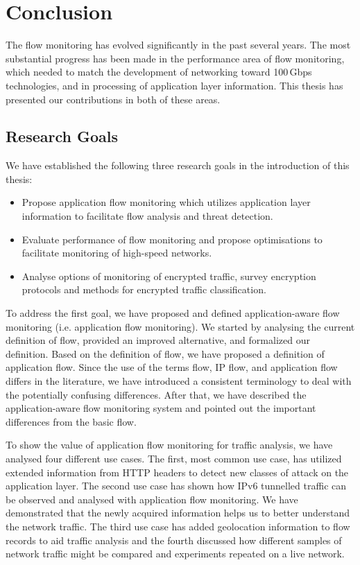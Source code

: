 \chapter{Conclusion}\label{chap:conclusions}

The flow monitoring has evolved significantly in the past several years. The most substantial progress has been made in the performance  area of flow monitoring, which needed to match the development of networking toward 100\,Gbps technologies, and in processing of application layer information. This thesis has presented our contributions in both of these areas. 

\section{Research Goals}

We have established the following three research goals in the introduction of this thesis:
\begin{itemize}
  \item Propose application flow monitoring which utilizes application layer information to facilitate flow analysis and threat detection.
  \item Evaluate performance of flow monitoring and propose optimisations to facilitate monitoring of high-speed networks.
  \item Analyse options of monitoring of encrypted traffic, survey encryption protocols and methods for encrypted traffic classification.
\end{itemize}

To address the first goal, we have proposed and defined application-aware flow monitoring (i.e. application flow monitoring). We started by analysing the current definition of flow, provided an improved alternative, and formalized our definition. Based on the definition of flow, we have proposed a definition of application flow. Since the use of the terms flow, IP flow, and application flow differs in the literature, we have introduced a consistent terminology to deal with the potentially confusing differences. After that, we have described the application-aware flow monitoring system and pointed out the important differences from the basic flow. 

To show the value of application flow monitoring for traffic analysis, we have analysed four different use cases. The first, most common use case, has utilized extended information from HTTP headers to detect new classes of attack on the application layer. The second use case has shown how IPv6 tunnelled traffic can be observed and analysed with application flow monitoring. We have demonstrated that the newly acquired information helps us to better understand the network traffic. The third use case has added geolocation information to flow records to aid traffic analysis and the fourth discussed how different samples of network traffic might be compared and experiments repeated on a live network.

